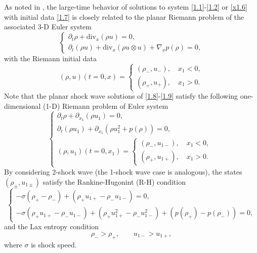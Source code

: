 \documentclass[10pt,reqno]{amsart}
\numberwithin{equation}{section}
\newcommand{\ddiv}{\mathrm{div}}
\begin{document}
As noted in \cite{MNS, GD, WY, WWS, GHSR, GHSS}, the large-time behavior of solutions to system \eqref{1.1}-\eqref{1.2} or \eqref{x1.6} with initial data \eqref{1.7} is closely
related to the planar Riemann problem of the associated 3-D Euler system
\begin{equation}\label{1.8}
\begin{cases}
\partial_t\rho+\ddiv_x(\rho u)=0,\\
\partial_t(\rho u)+\ddiv_x(\rho u\otimes u)+\nabla_x p(\rho)=0,
\end{cases}
\end{equation}
with the Riemann initial data
\begin{equation}\label{1.9}
(\rho,u)(t=0,x)=
\begin{cases}
(\rho_-,u_-),\quad x_1<0,\\
(\rho_+,u_+),\quad x_1>0.
\end{cases}
\end{equation}
Note that the planar shock wave solutions of \eqref{1.8}-\eqref{1.9} satisfy the following one-dimensional (1-D)  Riemann problem of Euler system
\begin{equation}\label{1.10}
\begin{cases}
\partial_t\rho+\partial_{x_1}(\rho u_1)=0,\\
\partial_t(\rho u_1)+\partial_{x_1}(\rho u_1^2+ p(\rho))=0,\\
(\rho,u_1)(t=0,x_1)=
\begin{cases}
(\rho_-,u_{1-}),\quad x_1<0,\\
(\rho_+,u_{1+}),\quad x_1>0.
\end{cases}
\end{cases}
\end{equation}
By considering 2-shock wave (the 1-shock wave case is analogous), the states $(\rho_\pm, u_{1\pm})$ satisfy the Rankine-Hugonint (R-H) condition
\begin{equation}\label{1.11rh}
\begin{cases}
-\sigma(\rho_+-\rho_-)+(\rho_+u_{1+}-\rho_-u_{1-})=0,\\
-\sigma(\rho_+u_{1+}-\rho_-u_{1-})+(\rho_+u_{1+}^2-\rho_-u_{1-}^2)+(p(\rho_+)-p(\rho_-))=0,
\end{cases}
\end{equation}
and the Lax entropy condition
\begin{equation}\label{1.12}
\rho_->\rho_+, \qquad u_{1-}>u_{1+},
\end{equation}
where $\sigma$ is shock speed.
\end{document}

